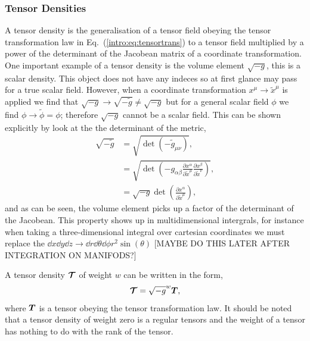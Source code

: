 \subsubsection{Tensor Densities}
A tensor density is the generalisation of a tensor field obeying the tensor transformation law in Eq.~(\ref{intro:eq:tensortrans}) to a tensor field multiplied by a power of the determinant of the Jacobean matrix of a coordinate transformation.
One important example of a tensor density is the volume element $\sqrt{-g}$, this is a scalar density. This object does not have any indeces so at first glance may pass for a true scalar field. However, when a coordinate transformation $x^\mu \rightarrow \tilde{x}^\mu$ is applied we find that $\sqrt{-g} \rightarrow \sqrt{-\tilde{g}} \neq \sqrt{-g}$ but for a general scalar field $\phi$ we find $\phi \rightarrow \tilde{\phi} = \phi$; therefore $\sqrt{-g}$ cannot be a scalar field. This can be shown explicitly by look at the the determinant of the metric,
\begin{align}
\sqrt{-\tilde{g}} &= \sqrt{\det(-\tilde{g}_{\mu\nu})},\\
&= \sqrt{\det\left(-g_{\alpha \beta} \frac{\partial x^\alpha}{\partial \tilde{x}^\mu}  \frac{\partial x^\beta}{\partial \tilde{x}^\nu} \right)} ,\\
&= \sqrt{-g} \det\left(\frac{\partial x^\alpha}{\partial \tilde{x}^\mu}\right)\label{intro:eq:rootgtrans},
\end{align}
and as can be seen, the volume element picks up a factor of the determinant of the Jacobean. This property shows up in multidimensional intergrals, for instance when taking a three-dimensional integral over cartesian coordinates we must replace the $\dd x \dd y \dd z \rightarrow \dd r \dd \theta \dd \phi r^2 \sin(\theta)$ [MAYBE DO THIS LATER AFTER INTEGRATION ON MANIFODS?]

A tensor density $\boldsymbol{\mathcal{T}}$ of weight $w$ can be written in the form, 
\begin{equation}\boldsymbol{\mathcal{T}} = \sqrt{-g}^w\boldsymbol{T},\end{equation}
 where $\boldsymbol{T}$ is a tensor obeying the tensor transformation law. It should be noted that a tensor density of weight zero is a regular tensors and the weight of a tensor has nothing to do with the rank of the tensor.



